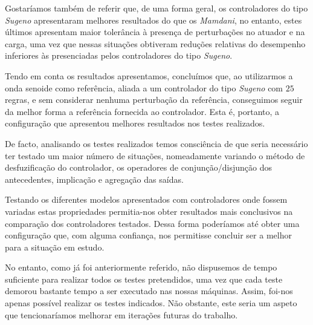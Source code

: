 \documentclass{article}
\begin{document}
Gostaríamos também de referir que, de uma forma geral, os controladores do tipo \emph{Sugeno} apresentaram melhores resultados do que os \emph{Mamdani}, no entanto, estes últimos apresentam maior tolerância à presença de perturbações no atuador e na carga, uma vez que nessas situações obtiveram reduções relativas do desempenho inferiores às presenciadas pelos controladores do tipo \emph{Sugeno}.

Tendo em conta os resultados apresentamos, concluímos que, ao utilizarmos a onda senoide como referência, aliada a um controlador do tipo \emph{Sugeno} com $25$ regras, e sem considerar nenhuma perturbação da referência, conseguimos seguir da melhor forma a referência fornecida ao controlador. Esta é, portanto, a configuração que apresentou melhores resultados nos testes realizados.

De facto, analisando os testes realizados temos consciência de que seria necessário ter testado um maior número de situações, nomeadamente variando o método de desfuzificação do controlador, os operadores de conjunção/disjunção dos antecedentes, implicação e agregação das saídas.

Testando os diferentes modelos apresentados com controladores onde fossem variadas estas propriedades permitia-nos obter resultados mais conclusivos na comparação dos controladores testados. Dessa forma poderíamos até obter uma configuração que, com alguma confiança, nos permitisse concluir ser a melhor para a situação em estudo.

No entanto, como já foi anteriormente referido, não dispusemos de tempo suficiente para realizar todos os testes pretendidos, uma vez que cada teste demorou bastante tempo a ser executado nas nossas máquinas. Assim, foi-nos apenas possível realizar os testes indicados. Não obstante, este seria um aspeto que tencionaríamos melhorar em iterações futuras do trabalho.
\end{document}
